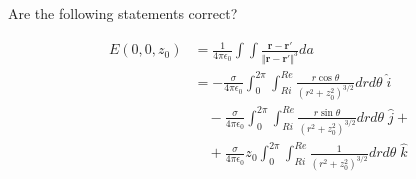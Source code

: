 \documentclass[12pt]{article}
\begin{document}
Are the following statements correct?

\begin{align*}
    E(0,0,z_0)&=\frac{1}{4\pi\epsilon_0}\int\int\frac{\mathbf{r}-\mathbf{r}'}{\Vert\mathbf{r}-\mathbf{r}'\Vert^3}da\\
              &=-\frac{\sigma}{4\pi\epsilon_0}\int_0^{2\pi}\int_{Ri}^{Re}\frac{r\cos\theta}{(r^2+z_0^2)^{3/2}}drd\theta\;\hat{i}\\
              &\quad-\frac{\sigma}{4\pi\epsilon_0}\int_0^{2\pi}\int_{Ri}^{Re}\frac{r\sin\theta}{(r^2+z_0^2)^{3/2}}drd\theta\;\hat{j}+\\
              &\quad+\frac{\sigma}{4\pi\epsilon_0}z_0\int_0^{2\pi}\int_{Ri}^{Re}\frac{1}{(r^2+z_0^2)^{3/2}}drd\theta\;\hat{k}
\end{align*}
\end{document}
